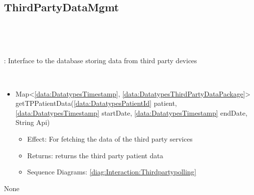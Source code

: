   \subsection{ThirdPartyDataMgmt}\label{int:InterfacesThirdPartyDataMgmt}
    \begin{description}
      \item[Provided by:] \iconcomponent{}~
      \item[Required by:] \iconcomponent{}~ 
           \item[Description]: Interface to the database storing data from third party devices
      \item[Operations:] ~
    \begin{itemize}[noitemsep,nolistsep,leftmargin=-.25cm]
      \item \textsf{Map\textless{}\ref{data:DatatypesTimestamp}, \ref{data:DatatypesThirdPartyDataPackage}\textgreater{} getTPPatientData(\ref{data:DatatypesPatientId} patient, \ref{data:DatatypesTimestamp} startDate, \ref{data:DatatypesTimestamp} endDate, String Api)}
        \begin{itemize}[noitemsep,nolistsep]
           \item Effect: For fetching the data of the third party services 
           \item Returns: returns the third party patient data
           \item Sequence Diagrams: \cref{diag:Interaction:Thirdpartypolling}
        \end{itemize}
    \end{itemize}
      \item[Diagrams:] None
    \end{description}

